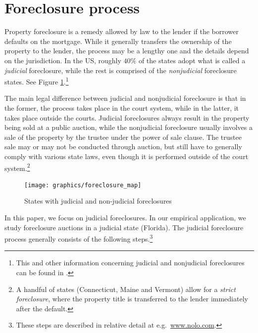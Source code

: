 \documentclass[11pt,twopage]{article}
\begin{document}
\section{Foreclosure process}
Property foreclosure is a remedy allowed by law to the lender if the borrower defaults on the mortgage. While it generally transfers the ownership of the property to the lender, the process may be a lengthy one and the details depend on the jurisdiction. In the US, roughly $40\%$ of the states adopt what is called a \emph{judicial} foreclosure, while the rest is comprised of the \emph{nonjudicial} foreclosure states. See Figure \ref{fig:judicial}.\footnote{This and other information concerning judicial and nonjudicial foreclosures can be found in \cite{nelson2004reforming}.}


The main legal difference between judicial and nonjudicial foreclosure is that in the former, the process takes place in the court system, while in the latter, it takes place outside the courts. Judicial foreclosures always result in the property being sold at a public auction, while the nonjudicial foreclosure usually involves a sale of the property by the trustee under the power of sale clause. The trustee sale may or may not be conducted through auction, but still have to generally comply with various state laws, even though it is performed outside of the court system.\footnote{A handful of states (Connecticut, Maine and Vermont) allow for a \emph{strict foreclosure}, where the property title is transferred to the lender immediately after the default.} 

\begin{figure}[t]
\centering
\texttt{[image: graphics/foreclosure\_map]}
\caption{States with judicial and non-judicial foreclosures}
\label{fig:judicial}
\end{figure}

In this paper, we focus on judicial foreclosures. In our empirical application, we study foreclosure auctions in a judicial state (Florida). The judicial foreclosure process generally consists of the following steps.\footnote{These steps are described in relative detail at e.g.\ \url{www.nolo.com}.}
\end{document}

